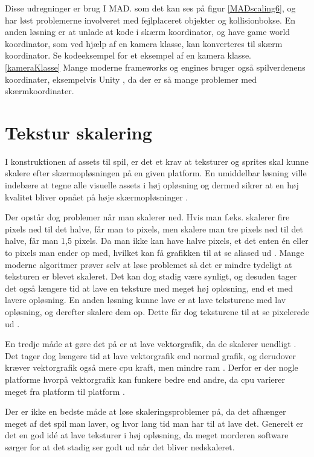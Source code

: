 \documentclass[Main.tex]{PositionOgSkalering}
\begin{document}
Disse udregninger er brug I MAD. som det kan ses på figur \ref{MADscaling6}, og har løst problemerne involveret med fejlplaceret objekter og kollisionbokse.
En anden løsning er at unlade at kode i skærm koordinator, og have game world koordinator, som ved hjælp af en kamera klasse, kan konverteres til skærm koordinator. Se kodeeksempel for et eksempel af en kamera klasse. \ref{kameraKlasse}
Mange moderne frameworks og engines bruger også spilverdenens koordinater, eksempelvis Unity \cite{unity3d}, da der er så mange problemer med skærmkoordinater.


\begin{figure}[h]
\lstset{numbers=left, language=[Sharp]C}

\end{figure}

\section{Tekstur skalering}
I konstruktionen af assets til spil, er det et krav at teksturer og sprites skal kunne skalere efter skærmopløsningen på en given platform. En umiddelbar løsning ville indebære at tegne alle visuelle assets i høj opløsning og dermed sikrer at en høj kvalitet bliver opnået på høje skærmopløsninger \cite{deepworldgame}.

Der opstår dog problemer når man skalerer ned. Hvis man f.eks. skalerer fire pixels ned til det halve, får man to pixels, men skalere man tre pixels ned til det halve, får man 1,5 pixels. Da man ikke kan have halve pixels, et det enten én eller to pixels man ender op med, hvilket kan få grafikken til at se aliased ud \cite{Martin}. Mange moderne algoritmer prøver selv at løse problemet så det er mindre tydeligt at teksturen er blevet skaleret.\cite{Kopf} Det kan dog stadig være synligt, og desuden tager det også længere tid at lave en teksture med meget høj opløsning, end et med lavere opløsning. En anden løsning  kunne lave er at lave teksturene med lav opløsning, og derefter skalere dem op. Dette får dog teksturene til at se pixelerede ud \cite{McHugh}.

En tredje måde at gøre det på er at lave vektorgrafik, da de skalerer uendligt \cite{deepworldgame}. Det tager dog længere tid at lave vektorgrafik end normal grafik,\cite{deepworldgame} og derudover kræver vektorgrafik også mere cpu kraft, men mindre ram \cite{deepworldgame}. Derfor er der nogle platforme hvorpå vektorgrafik kan funkere bedre end andre, da cpu varierer meget fra platform til platform \cite{PassMark}.

Der er ikke en bedste måde at løse skaleringsproblemer på, da det afhænger meget af det spil man laver, og hvor lang tid man har til at lave det. Generelt er det en god idé at lave teksturer i høj opløsning, da meget morderen software sørger for at det stadig ser godt ud når det bliver nedskaleret.
\end{document}
